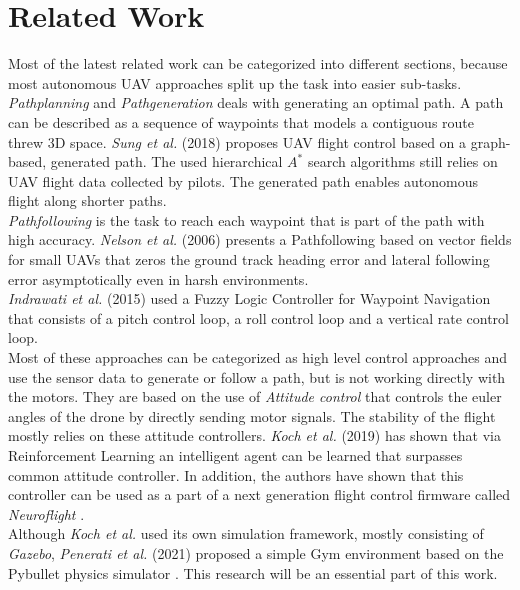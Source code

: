 \section{Related Work}
Most of the latest related work can be categorized into different sections,
because most autonomous UAV approaches split up the task into easier sub-tasks. \\
\emph{Pathplanning} and \emph{Pathgeneration} deals with generating
an optimal path. A path can be described as a sequence of waypoints that models
a contiguous route threw 3D space. 
\emph{Sung et al.} (2018) \cite{kwak2018autonomous} proposes UAV flight control
based on a graph-based, generated path. The used hierarchical $A^*$ search
algorithms still relies on UAV flight data collected by pilots.
The generated path enables autonomous flight along shorter paths. \\
\emph{Pathfollowing} is the task to reach each waypoint that is part of the path
with high accuracy. 
\emph{Nelson et al.} (2006) \cite{1657648} presents a Pathfollowing based
on vector fields for small UAVs that zeros the ground track heading error
and lateral following error asymptotically even in harsh environments. \\
\emph{Indrawati et al.} (2015) 
\cite{indrawati2015waypoint}
used a Fuzzy Logic Controller for Waypoint Navigation that consists of 
a pitch control loop, a roll control loop and a vertical rate control loop.\\
Most of these approaches can be categorized as high level control approaches and
use the sensor data to generate or follow a path, but is not working directly
with the motors. They are based on the use of \emph{Attitude control} that controls 
the euler angles of the drone by directly sending motor signals.
The stability of the flight mostly relies on these attitude controllers.
\emph{Koch et al.} (2019) \cite{koch2019reinforcement} has shown that via 
Reinforcement Learning an intelligent agent can be learned that surpasses 
common attitude controller.
In addition, the authors have shown that this controller can be used as a part of 
a next generation flight control firmware called \emph{Neuroflight} \cite{koch2019neuroflight}.\\
\newline
Although \emph{Koch et al.} used its own simulation framework, mostly consisting
of \emph{Gazebo}, \emph{Penerati et al.} (2021) \cite{panerati2021learning} proposed
a simple Gym environment based on the Pybullet physics simulator \cite{coumans2021}.
This research will be an essential part of this work.\\
